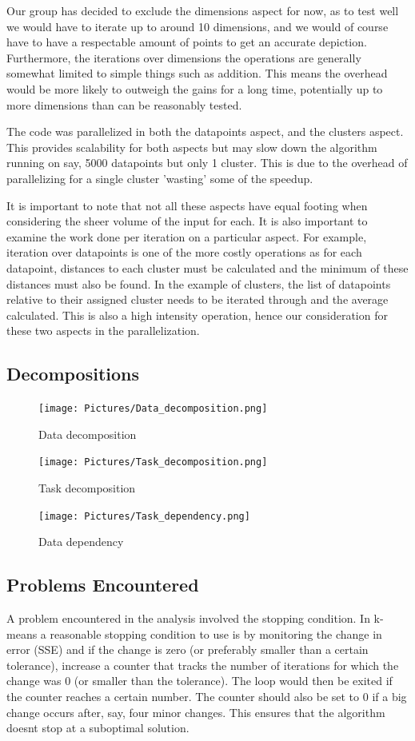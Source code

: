 \documentclass{article}
\begin{document}
Our group has decided to exclude the dimensions aspect for now, as to test well we would have to iterate up to around 10 dimensions, and we would of course have to have a respectable amount of points to get an accurate depiction. Furthermore, the iterations over dimensions the operations are generally somewhat limited to simple things such as addition. This means the overhead would be more likely to outweigh the gains for a long time, potentially up to more dimensions than can be reasonably tested.

The code was parallelized in both the datapoints aspect, and the clusters aspect. This provides scalability for both aspects but may slow down the algorithm running on say, 5000 datapoints but only 1 cluster. This is due to the overhead of parallelizing for a single cluster 'wasting' some of the speedup.

It is important to note that not all these aspects have equal footing when considering the sheer volume of the input for each. It is also important to examine the work done per iteration on a particular aspect. For example, iteration over datapoints is one of the more costly operations as for each datapoint, distances to each cluster must be calculated and the minimum of these distances must also be found. In the example of clusters, the list of datapoints relative to their assigned cluster needs to be iterated through and the average calculated. This is also a high intensity operation, hence our consideration for these two aspects in the parallelization.

\subsection{Decompositions}
\begin{figure}[h!]
	\texttt{[image: Pictures/Data\_decomposition.png]}
	\caption{Data decomposition}
\end{figure}

\begin{figure}[h!]
	\texttt{[image: Pictures/Task\_decomposition.png]}
	\caption{Task decomposition}
\end{figure}

\begin{figure}[h!]
	\texttt{[image: Pictures/Task\_dependency.png]}
	\caption{Data dependency}
\end{figure}

\newpage
\subsection{Problems Encountered}
A problem encountered in the analysis involved the stopping condition. In k-means a reasonable stopping condition to use is by monitoring the change in error (SSE) and if the change is zero (or preferably smaller than a certain tolerance), increase a counter that tracks the number of iterations for which the change was 0 (or smaller than the tolerance). The loop would then be exited if the counter reaches a certain number. The counter should also be set to 0 if a big change occurs after, say, four minor changes. This ensures that the algorithm doesnt stop at a suboptimal solution.
\end{document}
